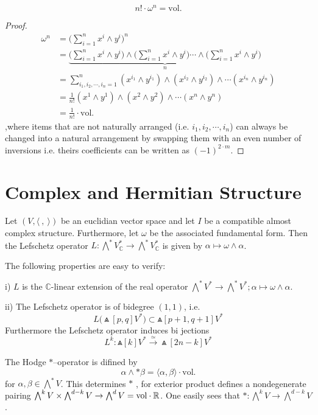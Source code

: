 \[
  n!\cdot \omega^n=\mathrm{vol}.
\]
\begin{proof}
  \begin{align*}
 \omega^n&=\bigl(\sum_{i=1}^{n}x^i\wedge y^i\bigr)^n\\
 &=\underbrace{\bigl(\sum_{i=1}^{n}x^i\wedge y^i\bigr)\wedge \bigl(\sum_{i=1}^{n}x^i\wedge y^i\bigr)\cdots\wedge \bigl(\sum_{i=1}^{n}x^i\wedge y^i\bigr)}_{n}\\
 &=\sum_{i_1,i_2,\cdots,i_n=1}^n (x^{i_1}\wedge y^{i_1})\wedge (x^{i_2}\wedge y^{i_2})\wedge\cdots (x^{i_n}\wedge y^{i_n})\\
 &=\frac{1}{n!} (x^1\wedge y^1)\wedge (x^2\wedge y^2)\wedge \cdots (x^n\wedge y^n)\\
 &=\frac{1}{n!}\cdot \mathrm{vol}.
  \end{align*}
  ,where items that are not naturally arranged (i.e. $i_1,i_2,\cdots,i_n$) can always be changed into a natural arrangement by swapping them with an even number of inversions i.e. theirs coefficients can be written as $(-1)^{2\cdot m}$.
\end{proof}
\Line
\section{Complex and Hermitian Structure}
\begin{definition}
   Let $(V,\langle~,~\rangle) $ be an euclidian vector space and let $I$ be a compatible almost complex structure. Furthermore, let $\omega$ be the associated fundamental form. Then the \textsf{Lefschetz operator} $L: \bigwedge^* V_{\mathbb{C}}^* \rightarrow \bigwedge^* V_{\mathbb{C}}^*$ is given by $\alpha \mapsto \omega \wedge \alpha$.
\end{definition}
\begin{remark}
The following properties are easy to verify:

i) $L$ is the $\mathbb{C}$-linear extension of the real operator $\bigwedge^* V^* \rightarrow \bigwedge^* V^*;  \alpha \mapsto \omega \wedge \alpha$.

ii) The Lefschetz operator is of bidegree $(1,1)$, i.e.
$$
L\bigl(\Wedge[p, q] V^*\bigr) \subset \Wedge[p+1, q+1] V^*
$$
Furthermore the Lefschetz operator induces bi jections
$$
L^k: \Wedge[k] V^* \stackrel{\simeq}{\longrightarrow} \Wedge[2n-k] V^*
$$
\end{remark}

\begin{definition}
  The \textsf{Hodge $*$--operator} is difined by 
\[
  \alpha\wedge*\beta=\langle\alpha,\beta\rangle\cdot \mathrm{vol}.
\]
for $\alpha,\beta\in \bigwedge^* V$. This determines $*$ , for exterior product defines a nondegenerate pairing $\bigwedge^k V\times \bigwedge^{d-k} V\to \bigwedge^d V=\mathrm{vol}\cdot {\mathbb R}$. One easily sees that $*\colon \bigwedge^k V\to \bigwedge^{d-k} V$.
\end{definition}

